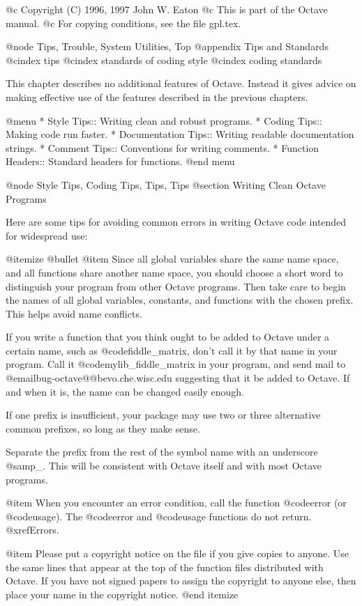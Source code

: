 @c Copyright (C) 1996, 1997 John W. Eaton
@c This is part of the Octave manual.
@c For copying conditions, see the file gpl.tex.

@node Tips, Trouble, System Utilities, Top
@appendix Tips and Standards
@cindex tips
@cindex standards of coding style
@cindex coding standards

This chapter describes no additional features of Octave.  Instead it
gives advice on making effective use of the features described in the
previous chapters.

@menu
* Style Tips::                  Writing clean and robust programs.
* Coding Tips::                 Making code run faster.
* Documentation Tips::          Writing readable documentation strings.
* Comment Tips::                Conventions for writing comments.
* Function Headers::            Standard headers for functions.
@end menu

@node Style Tips, Coding Tips, Tips, Tips
@section Writing Clean Octave Programs

Here are some tips for avoiding common errors in writing Octave code
intended for widespread use:

@itemize @bullet
@item
Since all global variables share the same name space, and all functions
share another name space, you should choose a short word to distinguish
your program from other Octave programs.  Then take care to begin the
names of all global variables, constants, and functions with the chosen
prefix.  This helps avoid name conflicts.

If you write a function that you think ought to be added to Octave under
a certain name, such as @code{fiddle_matrix}, don't call it by that name
in your program.  Call it @code{mylib_fiddle_matrix} in your program,
and send mail to @email{bug-octave@@bevo.che.wisc.edu} suggesting that it
be added to Octave.  If and when it is, the name can be changed easily
enough.

If one prefix is insufficient, your package may use two or three
alternative common prefixes, so long as they make sense.

Separate the prefix from the rest of the symbol name with an underscore
@samp{_}.  This will be consistent with Octave itself and with most
Octave programs.

@item
When you encounter an error condition, call the function @code{error}
(or @code{usage}).  The @code{error} and @code{usage} functions do not
return.
@xref{Errors}.

@item
Please put a copyright notice on the file if you give copies to anyone.
Use the same lines that appear at the top of the function files
distributed with Octave.  If you have not signed papers to assign the
copyright to anyone else, then place your name in the copyright notice.
@end itemize

